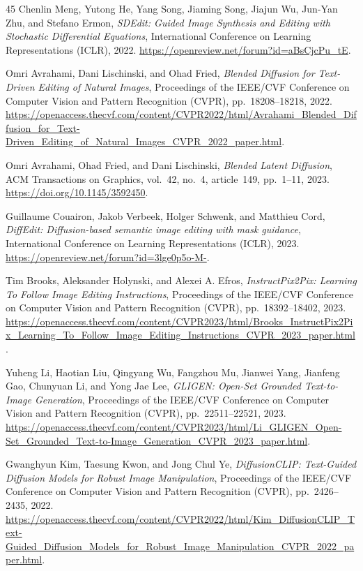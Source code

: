 \documentclass[conference]{IEEEtran}
\begin{document}
\begin{thebibliography}{45}
Chenlin Meng, Yutong He, Yang Song, Jiaming Song, Jiajun Wu, Jun-Yan Zhu, and Stefano Ermon,
\textit{SDEdit: Guided Image Synthesis and Editing with Stochastic Differential Equations},
International Conference on Learning Representations (ICLR), 2022.
\url{https://openreview.net/forum?id=aBsCjcPu_tE}.

Omri Avrahami, Dani Lischinski, and Ohad Fried,
\textit{Blended Diffusion for Text-Driven Editing of Natural Images},
Proceedings of the IEEE/CVF Conference on Computer Vision and Pattern Recognition (CVPR), pp.~18208--18218, 2022.
\url{https://openaccess.thecvf.com/content/CVPR2022/html/Avrahami_Blended_Diffusion_for_Text-Driven_Editing_of_Natural_Images_CVPR_2022_paper.html}.

Omri Avrahami, Ohad Fried, and Dani Lischinski,
\textit{Blended Latent Diffusion},
ACM Transactions on Graphics, vol.~42, no.~4, article~149, pp.~1--11, 2023.
\url{https://doi.org/10.1145/3592450}.

Guillaume Couairon, Jakob Verbeek, Holger Schwenk, and Matthieu Cord,
\textit{DiffEdit: Diffusion-based semantic image editing with mask guidance},
International Conference on Learning Representations (ICLR), 2023.
\url{https://openreview.net/forum?id=3lge0p5o-M-}.

Tim Brooks, Aleksander Holynski, and Alexei A. Efros,
\textit{InstructPix2Pix: Learning To Follow Image Editing Instructions},
Proceedings of the IEEE/CVF Conference on Computer Vision and Pattern Recognition (CVPR), pp.~18392--18402, 2023.
\url{https://openaccess.thecvf.com/content/CVPR2023/html/Brooks_InstructPix2Pix_Learning_To_Follow_Image_Editing_Instructions_CVPR_2023_paper.html}.

Yuheng Li, Haotian Liu, Qingyang Wu, Fangzhou Mu, Jianwei Yang, Jianfeng Gao, Chunyuan Li, and Yong Jae Lee,
\textit{GLIGEN: Open-Set Grounded Text-to-Image Generation},
Proceedings of the IEEE/CVF Conference on Computer Vision and Pattern Recognition (CVPR), pp.~22511--22521, 2023.
\url{https://openaccess.thecvf.com/content/CVPR2023/html/Li_GLIGEN_Open-Set_Grounded_Text-to-Image_Generation_CVPR_2023_paper.html}.

Gwanghyun Kim, Taesung Kwon, and Jong Chul Ye,
\textit{DiffusionCLIP: Text-Guided Diffusion Models for Robust Image Manipulation},
Proceedings of the IEEE/CVF Conference on Computer Vision and Pattern Recognition (CVPR), pp.~2426--2435, 2022.
\url{https://openaccess.thecvf.com/content/CVPR2022/html/Kim_DiffusionCLIP_Text-Guided_Diffusion_Models_for_Robust_Image_Manipulation_CVPR_2022_paper.html}.


\end{thebibliography}
\end{document}
